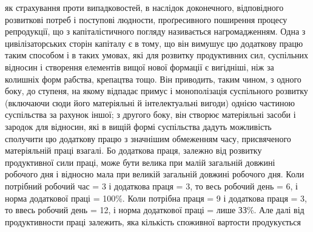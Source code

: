 як страхування проти випадковостей, в наслідок доконечного, відповідного розвиткові
потреб і поступові людности, проґресивного поширення процесу репродукції,
що з капіталістичного погляду називається нагромадженням. Одна з цивілізаторських
сторін капіталу є в тому, що він вимушує цю додаткову працю
таким способом і в таких умовах, які для розвитку продуктивних сил, суспільних
відносин і створення елементів вищої нової формації є вигідніші, ніж за колишніх
форм рабства, крепацтва тощо. Він приводить, таким чином, з одного боку, до
ступеня, на якому відпадає примус і монополізація суспільного розвитку (включаючи
сюди його матеріяльні й інтелектуальні вигоди) однією частиною суспільства
за рахунок іншої; з другого боку, він створює матеріяльні засоби
і зародок для відносин, які в вищій формі суспільства дадуть можливість сполучити
цю додаткову працю з значнішим обмеженням часу, присвяченого матеріяльній
праці взагалі. Бо додаткова праця, залежно від розвитку продуктивної
сили праці, може бути велика при малій загальній довжині робочого дня і відносно
мала при великій загальній довжині робочого дня. Коли потрібний робочий
час = 3 і додаткова праця = 3, то весь робочий день = 6, і норма додаткової
праці = 100\%. Коли потрібна праця = 9 і додаткова праця = 3, то ввесь
робочий день = 12, і норма додаткової праці = лише ЗЗ\%. Але далі від продуктивности
праці залежить, яка кількість споживної вартости продукується
\parbreak{}  %

